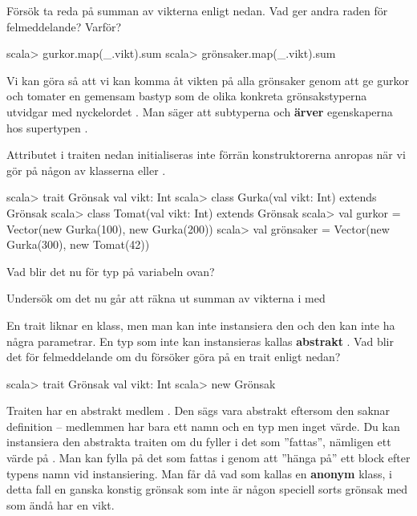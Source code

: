 \Subtask Försök ta reda på summan av vikterna enligt nedan. Vad ger andra raden för felmeddelande? Varför?

\begin{REPL}
scala> gurkor.map(_.vikt).sum
scala> grönsaker.map(_.vikt).sum
\end{REPL}

\Subtask Vi kan göra så att vi kan komma åt vikten på alla grönsaker genom att ge gurkor och tomater en gemensam bastyp som de olika konkreta grönsakstyperna utvidgar med nyckelordet . Man säger att subtyperna  och  \textbf{ärver} egenskaperna hos supertypen .

Attributet  i traiten  nedan initialiseras inte förrän konstruktorerna anropas när vi gör  på någon av klasserna  eller .

\begin{REPL}
scala> trait Grönsak { val vikt: Int }
scala> class Gurka(val vikt: Int) extends Grönsak
scala> class Tomat(val vikt: Int) extends Grönsak
scala> val gurkor = Vector(new Gurka(100), new Gurka(200))
scala> val grönsaker = Vector(new Gurka(300), new Tomat(42))
\end{REPL}

\Subtask Vad blir det nu för typ på variabeln  ovan?

\Subtask Undersök om det nu går att räkna ut summan av vikterna i  med \\ 


\Subtask En trait liknar en klass, men man kan inte instansiera den och den kan inte ha några parametrar. En typ som inte kan instansieras kallas \textbf{abstrakt} . Vad blir det för felmeddelande om du försöker göra  på en trait enligt nedan?
\begin{REPL}
scala> trait Grönsak { val vikt: Int }
scala> new Grönsak
\end{REPL}


\Subtask Traiten  har en abstrakt medlem . Den sägs vara abstrakt eftersom den saknar definition -- medlemmen har bara ett namn och en typ men inget värde. Du kan instansiera den abstrakta traiten  om du fyller i det som ''fattas'', nämligen ett värde på . Man kan fylla på det som fattas i genom att ''hänga på'' ett block efter typens namn vid instansiering. Man får då vad som kallas en \textbf{anonym} klass, i detta fall en ganska konstig grönsak som inte är någon speciell sorts grönsak med som ändå har en vikt.

